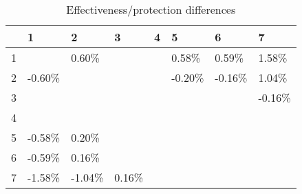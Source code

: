 \begin{table}[ht]
\centering
\begin{tabular}{rlllllll}
  \hline
 & 1 & 2 & 3 & 4 & 5 & 6 & 7 \\ 
  \hline
1 &  & 0.60\% &  &  & 0.58\% & 0.59\% & 1.58\% \\ 
  2 & -0.60\% &  &  &  & -0.20\% & -0.16\% & 1.04\% \\ 
  3 &  &  &  &  &  &  & -0.16\% \\ 
  4 &  &  &  &  &  &  &  \\ 
  5 & -0.58\% & 0.20\% &  &  &  &  &  \\ 
  6 & -0.59\% & 0.16\% &  &  &  &  &  \\ 
  7 & -1.58\% & -1.04\% & 0.16\% &  &  &  &  \\ 
   \hline
\end{tabular}
\caption{Effectiveness/protection differences} 
\end{table}
